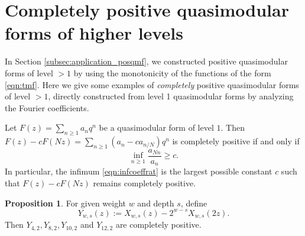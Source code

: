 \documentclass[10pt,reqno]{amsproc}
\newcommand{\1}{\mathds{1}}	%
\theoremstyle{definition}
\newtheorem{proposition}[theorem]{Proposition}
\theoremstyle{remark}
\begin{document}
\appendix

\section{Completely positive quasimodular forms of higher levels}
\label{appendix:comppos}

In Section \ref{subsec:application_posqmf}, we constructed positive quasimodular forms of level $> 1$ by using the monotonicity of the functions of the form \eqref{eqn:tmf}.
Here we give some examples of \emph{completely} positive quasimodular forms of level $>1$, directly constructed from level 1 quasimodular forms by analyzing the Fourier coefficients.

Let $F(z) = \sum_{n \ge 1} a_n q^n$ be a quasimodular form of level $1$.
Then $F(z) - c F(Nz) = \sum_{n \ge 1} (a_n - c a_{n/N}) q^n$ is completely positive if and only if
\begin{equation}
    \inf_{n \ge 1} \frac{a_{Nn}}{a_n} \ge c.
    \label{eqn:infcoeffrat}
\end{equation}
In particular, the infimum \eqref{eqn:infcoeffrat} is the largest possible constant $c$ such that $F(z) - c F(Nz)$ remains completely positive.

\begin{proposition}
    \label{prop:extYpos}
    For given weight $w$ and depth $s$, define
    \[
        Y_{w, s}(z) := X_{w, s}(z) - 2^{w-s} X_{w, s}(2z).
    \]
    Then $Y_{4, 2}, Y_{8, 2}, Y_{10, 2}$ and $Y_{12,2}$ are completely positive.
\end{proposition}
\end{document}
